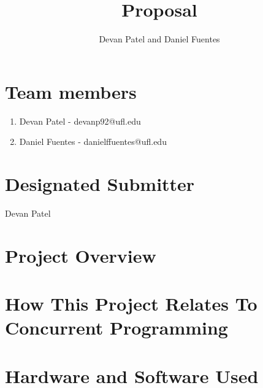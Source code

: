 \documentclass[12pt,a4paper]{report}
\author{Devan Patel and Daniel Fuentes}
\title{Proposal}
\begin{document}
\maketitle
\newpage
\section{Team members}
\begin{enumerate}
\item Devan Patel - devanp92@ufl.edu
\item Daniel Fuentes - danielffuentes@ufl.edu
\end{enumerate}
\section{Designated Submitter}
\indent		Devan Patel
\section{Project Overview}

\section{How This Project Relates To Concurrent Programming}

\section{Hardware and Software Used}
\end{document}
